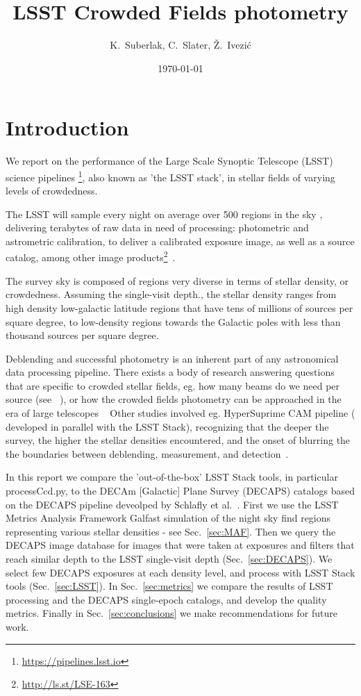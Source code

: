 \documentclass[DM,lsstdraft,toc,usenatbib]{lsstdoc}
\title[Crowded fields ]{LSST  Crowded Fields photometry}
\author{
K.~Suberlak, C.~Slater, \v{Z}.~Ivezi\'c}
\date{\today}
\begin{document}
\maketitle

\section{Introduction}

We report on the performance of the Large Scale Synoptic Telescope (LSST) science pipelines \footnote{\url{https://pipelines.lsst.io}}, also known as 'the LSST stack', in stellar fields of varying levels of crowdedness.

The LSST will sample every night on average over 500  regions in the sky , delivering terabytes of raw data in need of processing: photometric  and astrometric calibration, to deliver a calibrated exposure image, as well as a source catalog, among other image products\footnote{\url{http://ls.st/LSE-163}}~\cite{narayan2018}.

The survey sky is composed of regions very diverse in terms of stellar density, or crowdedness. Assuming the single-visit depth., the stellar density ranges from high density low-galactic latitude regions that have tens of millions of sources per square degree, to low-density regions towards the Galactic poles with less than thousand sources per square degree. 

Deblending and successful photometry is an inherent part of any astronomical data processing pipeline.  There exists a body of research answering questions that are specific to crowded stellar fields, eg. how many beams do we need per source (see ~\citep{hogg2001}), or how  the crowded fields photometry can be approached in the era of large telescopes ~\cite{olsen2003} Other studies involved eg. HyperSuprime CAM pipeline ( developed in parallel with the LSST Stack), recognizing that the deeper the survey, the higher the stellar densities encountered, and the onset of blurring the the boundaries between deblending, measurement, and detection~\cite{bosch2017}. 

In this report we compare the 'out-of-the-box' LSST Stack tools, in particular processCcd.py, to the DECAm [Galactic] Plane Survey (DECAPS) catalogs based on the DECAPS pipeline deveolped by Schlafly et al.~\cite{schlafly2017}. First we use the LSST Metrics Analysis Framework Galfast simulation of the night sky find regions representing various stellar densities - see Sec.~\ref{sec:MAF}. Then we query the DECAPS image database for images that were taken at exposures and filters that reach similar depth to the LSST single-visit depth (Sec.~\ref{sec:DECAPS}). We select few DECAPS exposures at each density level, and process with LSST Stack tools (Sec.~\ref{sec:LSST}). In Sec.~\ref{sec:metrics} we compare the results of LSST processing and the DECAPS single-epoch catalogs, and develop the quality metrics.  Finally in Sec.~\ref{sec:conclusions} we make recommendations for future work. 
\end{document}

